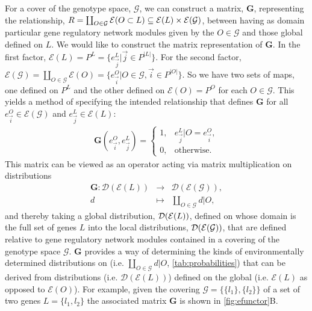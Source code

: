 For a cover of the genotype space, $\mathcal{G}$, we can construct a matrix, $\mathbf{G}$, representing the relationship, $R = \coprod_{O \in \mathcal{G}} \mathcal{E}(O \subset L) \subseteq \mathcal{E}(L) \times \mathcal{E} (\mathcal{G})$, between \gnpm{} having as domain particular gene regulatory network modules given by the $O \in \mathcal{G}$ and those global \gnpm{} defined on $L$. We would like to construct the matrix representation of $\mathbf{G}$. In the first factor, $\mathcal{E}(L) = P^L = \{e^{L}_{\vec{j}} | \vec{j} \in P^{|L|}\}$.
For the second factor, $ \mathcal{E}(\mathcal{G}) = \coprod_{O \in \mathcal{G}} \mathcal{E}(O) = \{e^O_{\vec{i}} | O \in \mathcal{G}, \vec{i} \in P^{|O|} \}$.
 So we have two sets of maps, one defined on $P^L$ and the other defined on $\mathcal{E}(O) = P^O$ for each $O \in \mathcal{G}$. This yields a method of specifying the intended relationship that defines $\mathbf{G}$ for all $e^O_{\vec{i}} \in \mathcal{E}(\mathcal{G})$ and $e^{L}_{\vec{j}} \in \mathcal{E}(L)$:
\begin{eqnarray}\label{eq:margmat}
\mathbf{G}(e^O_{\vec{i}},e^L_{\vec{j}}) =
\begin{cases}
1, & e^L_{\vec{j}}|O = e^O_{\vec{i}},\\
0, & \text{otherwise}.
\end{cases}
\end{eqnarray}
This matrix can be viewed as an operator acting via matrix multiplication on distributions
\begin{eqnarray*}
\mathbf{G} \colon \mathcal{D}(\mathcal{E}(L)) &\rightarrow& \mathcal{D}( \mathcal{E}(\mathcal{G})),\\
d &\mapsto& \coprod_{O \in \mathcal{G}} d|O,
\end{eqnarray*}
and thereby taking a global distribution, $\mathcal{D} (\mathcal{E}(L))$, defined on \gnpm{} whose domain is the full set of genes $L$ into the local distributions, $\mathcal{D} (\mathcal{E}(\mathcal{G}))$, that are defined relative to gene regulatory network modules contained in a covering of the genotype space $\mathcal{G}$. $\mathbf{G}$ provides a way of determining the kinds of environmentally determined distributions on \gnpm{} (i.e. $\coprod_{O \in \mathcal{G}} d|O$, \ref{tab:probabilities}) that can be derived from distributions (i.e. $\mathcal{D} ( \mathcal{E}(L) )$) defined on the global \gnpm{} (i.e. $\mathcal{E}(L)$ as opposed to $\mathcal{E}(O)$). For example, given the covering $\mathcal{G} = \{ \{l_1\}, \{l_2\} \}$ of a set of two genes $L = \{ l_1, l_2 \}$ the associated matrix $\mathbf{G}$ is shown in \ref{fig:efunctor}B.

